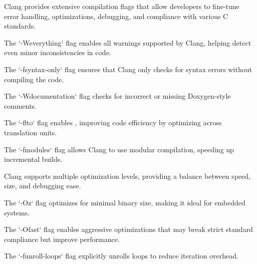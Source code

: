\begin{NxSSSSBox}
	\begin{NxIDBox}
		Clang provides extensive compilation flags that allow developers to fine-tune error handling, optimizations, debugging, and compliance with various C standards.
	\end{NxIDBox}
	\begin{NxIDBox}
		The `-Weverything` flag enables all warnings supported by Clang, helping detect even minor inconsistencies in code.
	\end{NxIDBox}
	\begin{NxIDBox}
		The `-fsyntax-only` flag ensures that Clang only checks for syntax errors without compiling the code.
	\end{NxIDBox}
	\begin{NxIDBox}
		The `-Wdocumentation` flag checks for incorrect or missing Doxygen-style comments.
	\end{NxIDBox}
	\begin{NxIDBox}
		The `-flto` flag enables , improving code efficiency by optimizing across translation units.
	\end{NxIDBox}
	\begin{NxIDBox}
		The `-fmodules` flag allows Clang to use modular compilation, speeding up incremental builds.
	\end{NxIDBox}
\end{NxSSSSBox}

\begin{NxSSSSBox}
	\begin{NxIDBox}
		Clang supports multiple optimization levels, providing a balance between speed, size, and debugging ease.
	\end{NxIDBox}
	\begin{NxIDBox}
		The `-Oz` flag optimizes for minimal binary size, making it ideal for embedded systems.
	\end{NxIDBox}
	\begin{NxIDBox}
		The `-Ofast` flag enables aggressive optimizations that may break strict standard compliance but improve performance.
	\end{NxIDBox}
	\begin{NxIDBox}
		The `-funroll-loops` flag explicitly unrolls loops to reduce iteration overhead.
	\end{NxIDBox}
\end{NxSSSSBox}

